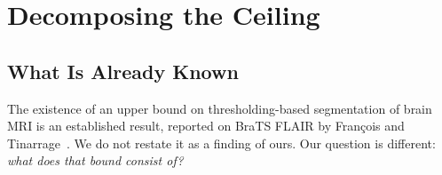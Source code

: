 %
%
%
\section{Decomposing the Ceiling}
\label{sec:ceiling}

\subsection{What Is Already Known}

The existence of an upper bound on thresholding-based segmentation of brain MRI
is an established result, reported on BraTS FLAIR by François and
Tinarrage~\cite{francois_jmiv}. We do not restate it as a finding of ours. Our
question is different: \emph{what does that bound consist of?}


